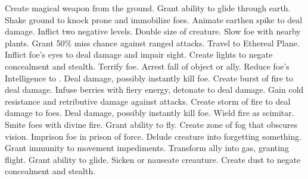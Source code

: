     {Create magical weapon from the ground.}
    {Grant ability to glide through earth.}
    {Shake ground to knock prone and immobilize foes.}
    {Animate earthen spike to deal damage.}
    {Inflict two negative levels.}
    {Double size of creature.}
    {Slow foe with nearby plants.}
    {Grant 50\% miss chance against ranged attacks.}
    {Travel to Ethereal Plane.}
    {Inflict foe's eyes to deal damage and impair sight.}
    {Create lights to negate concealment and stealth.}
    {Terrify foe.}
    {Arrest fall of object or ally.}
    {Reduce foe's Intelligence to .}
    {Deal damage, possibly instantly kill foe.}
    {Create burst of fire to deal damage.}
    {Infuse berries with fiery energy, detonate to deal damage.}
    {Gain cold resistance and retributive damage against attacks.}
    {Create storm of fire to deal damage to foes.}
    {Deal damage, possibly instantly kill foe.}
    {Wield fire as scimitar.}
    {Smite foes with divine fire.}
    {Grant ability to fly.}
    {Create zone of fog that obscures vision.}
    {Imprison foe in prison of force.}
    {Delude creature into forgetting something.}
    {Grant immunity to movement impediments.}
    {Transform ally into gas, granting flight.}
    {Grant ability to glide.}
    {Sicken or nauseate creauture.}
    {Create dust to negate concealment and stealth.}
